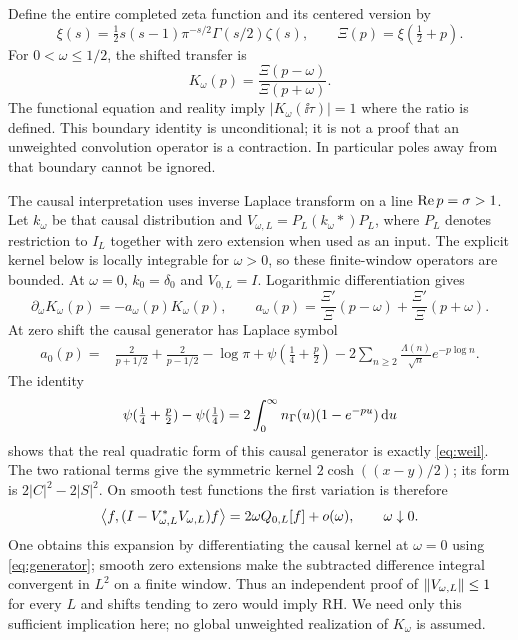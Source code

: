 Define the entire completed zeta function and its centered version by
\begin{equation}
 \xi(s)=\tfrac12s(s-1)\pi^{-s/2}\Gamma(s/2)\zeta(s),
 \qquad \Xi(p)=\xi(\tfrac12+p).
\end{equation}
For $0<\omega\leq1/2$, the shifted transfer is
\begin{equation}\label{eq:transfer}
 K_\omega(p)=\frac{\Xi(p-\omega)}{\Xi(p+\omega)}.
\end{equation}
The functional equation and reality imply $|K_\omega(\ii\tau)|=1$
where the ratio is defined. This boundary identity is unconditional;
it is not a proof that an unweighted convolution operator is a
contraction. In particular poles away from that boundary cannot be
ignored.

The causal interpretation uses inverse Laplace transform on a line
$\operatorname{Re} p=\sigma>1$. Let $k_\omega$ be that causal distribution and
$V_{\omega,L}=P_L(k_\omega*)P_L$, where $P_L$ denotes restriction to
$I_L$ together with zero extension when used as an input. The explicit
kernel below is locally integrable for $\omega>0$, so these finite-window
operators are bounded. At $\omega=0$, $k_0=\delta_0$ and $V_{0,L}=I$.
Logarithmic differentiation gives
\begin{equation}
 \partial_\omega K_\omega(p)=-a_\omega(p)K_\omega(p),\qquad
 a_\omega(p)=\frac{\Xi'}{\Xi}(p-\omega)
             +\frac{\Xi'}{\Xi}(p+\omega).
\end{equation}
At zero shift the causal generator has Laplace symbol
\begin{align}\label{eq:generator}
 a_0(p)={}&\frac2{p+1/2}+\frac2{p-1/2}-\log\pi
 +\psi(\tfrac14+\tfrac p2)
 -2\sum_{n\geq2}\frac{\Lambda(n)}{\sqrt n}e^{-p\log n}.
\end{align}
The identity
\begin{equation}
 \psi(\tfrac14+\tfrac p2)-\psi(\tfrac14)
 =2\int_0^\infty n_\Gamma(u)(1-e^{-pu})\,\mathrm d u
\end{equation}
shows that the real quadratic form of this causal generator is exactly
\eqref{eq:weil}. The two rational terms give the symmetric kernel
$2\cosh((x-y)/2)$; its form is $2|C|^2-2|S|^2$.
On smooth test functions the first variation is therefore
\begin{equation}\label{eq:first-variation-arithmetic}
 \left\langle f,(I-V_{\omega,L}^*V_{\omega,L})f\right\rangle
 =2\omega Q_{0,L}[f]+o(\omega),\qquad\omega\downarrow0.
\end{equation}
One obtains this expansion by differentiating the causal kernel at
$\omega=0$ using \eqref{eq:generator}; smooth zero extensions make the
subtracted difference integral convergent in $L^2$ on a finite window.
Thus an independent proof of $\left\lVert V_{\omega,L}\right\rVert\leq1$ for every $L$
and shifts tending to zero would imply RH. We need only this sufficient
implication here; no global unweighted realization of $K_\omega$ is
assumed.

